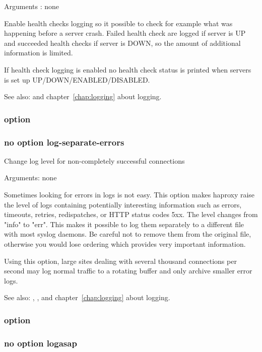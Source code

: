 {

  Arguments : none

  Enable health checks logging so it possible to check for example what
  was happening before a server crash. Failed health check are logged if
  server is UP and succeeded health checks if server is DOWN, so the amount
  of additional information is limited.

  If health check logging is enabled no health check status is printed
  when servers is set up UP/DOWN/ENABLED/DISABLED.

  See also:  and chapter~\ref{chap:logging} about logging.

\subsubsection[log-separate-errors]{option }
\subsubsection*{no option log-separate-errors}

  Change log level for non-completely successful connections


  Arguments: none

  Sometimes looking for errors in logs is not easy. This option makes haproxy
  raise the level of logs containing potentially interesting information such
  as errors, timeouts, retries, redispatches, or HTTP status codes 5xx. The
  level changes from "info" to "err". This makes it possible to log them
  separately to a different file with most syslog daemons. Be careful not to
  remove them from the original file, otherwise you would lose ordering which
  provides very important information.

  Using this option, large sites dealing with several thousand connections per
  second may log normal traffic to a rotating buffer and only archive smaller
  error logs.

  See also: , ,  and chapter~\ref{chap:logging} about
             logging.

\subsubsection[logasap]{option }
\subsubsection*{no option logasap}

}
